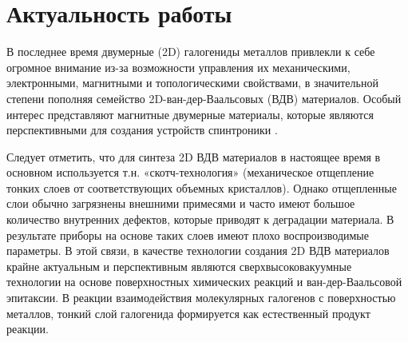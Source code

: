 \documentclass[a4paper,12pt]{article}
\author{Сергей Захаров}
\date{\today}
\theoremstyle{plain} %
\theoremstyle{definition} %
\theoremstyle{remark} %
\begin{document}


\tableofcontents

\newpage

\section{Актуальность работы}

В последнее время двумерные (2D) галогениды металлов привлекли к себе огромное внимание из-за возможности управления их механическими, электронными, магнитными и топологическими свойствами, в значительной степени пополняя семейство 2D-ван-дер-Ваальсовых (ВДВ) материалов. Особый интерес представляют магнитные двумерные материалы, которые являются перспективными для создания устройств спинтроники \cite{1, 2, 3, 4}.

Следует отметить, что для синтеза 2D ВДВ материалов в настоящее время в основном используется т.н. «скотч-технология» (механическое отщепление тонких слоев от соответствующих объемных кристаллов). Однако отщепленные слои обычно загрязнены внешними примесями и часто имеют большое количество внутренних дефектов, которые приводят к деградации материала. В результате приборы на основе таких слоев имеют плохо воспроизводимые параметры. В этой связи, в качестве технологии создания 2D ВДВ материалов крайне актуальным и перспективным являются сверхвысоковакуумные технологии на основе поверхностных химических реакций и ван-дер-Ваальсовой эпитаксии. В реакции взаимодействия молекулярных галогенов с поверхностью металлов, тонкий слой галогенида формируется как естественный продукт реакции.


\end{document}

